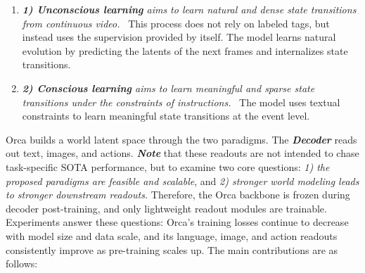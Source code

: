 \vspace{-1ex}
\begin{enumerate}[label={}, leftmargin=10pt, itemindent=0pt, itemsep=0.3em, topsep=0.3em]
    \item[] \textit{\textbf{1) Unconscious learning} aims to learn natural and dense state transitions from continuous video.} \ This process does not rely on labeled tags, but instead uses the supervision provided by itself. The model learns natural evolution by predicting the latents of the next frames and internalizes state transitions. 
    \item[] \textit{\textbf{2) Conscious learning} aims to learn meaningful and sparse state transitions under the constraints of instructions.} \ The model uses textual constraints to learn meaningful state transitions at the event level.
\end{enumerate}

Orca builds a world latent space through the two paradigms. The \textbf{\textit{Decoder}} reads out text, images, and actions. \textbf{\textit{Note}} that these readouts are not intended to chase task-specific SOTA performance, but to examine two core questions: \textit{1) the proposed paradigms are feasible and scalable}, and \textit{2) stronger world modeling leads to stronger downstream readouts.} Therefore, the Orca backbone is frozen during decoder post-training, and only lightweight readout modules are trainable. Experiments answer these questions: Orca's training losses continue to decrease with model size and data scale, and its language, image, and action readouts consistently improve as pre-training scales up. The main contributions are as follows:

